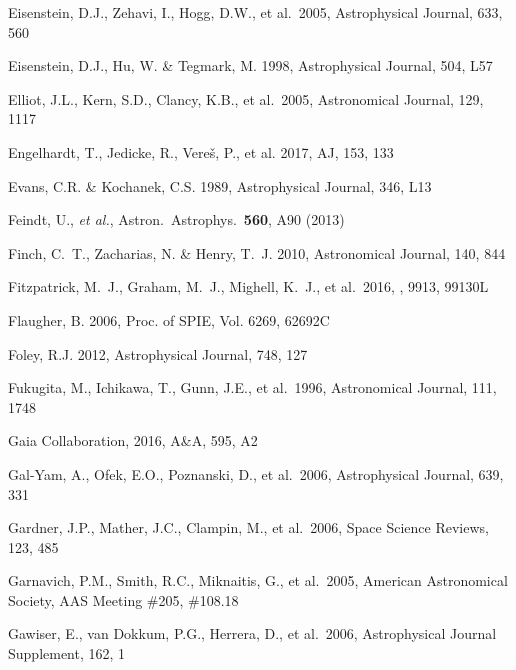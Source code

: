 \documentclass[twocolumn]{aastex61}
\begin{document}
\begin{thebibliography}{}
 Eisenstein, D.J., Zehavi, I., Hogg, D.W., et al.~2005, Astrophysical Journal, 633, 560

 Eisenstein, D.J., Hu, W. \& Tegmark, M. 1998, Astrophysical Journal, 504, L57

 Elliot, J.L., Kern, S.D., Clancy, K.B., et al.~2005,  Astronomical Journal, 129, 1117

 Engelhardt, T., Jedicke, R., Vere\v{s}, P., et al. 2017, AJ, 153, 133

 Evans, C.R. \& Kochanek, C.S. 1989, Astrophysical Journal, 346, L13

 Feindt, U., {\it et al.}, Astron.\ Astrophys.\  {\bf 560}, A90 (2013)

 Finch, C.~T., Zacharias, N. \& Henry, T.~J. 2010, Astronomical Journal, 140, 844

 Fitzpatrick, M.~J., Graham, M.~J., Mighell, K.~J., et al.\ 2016, \procspie, 9913, 99130L

 Flaugher, B. 2006, Proc. of SPIE, Vol. 6269, 62692C

 Foley, R.J. 2012, Astrophysical Journal, 748, 127

 Fukugita, M., Ichikawa, T., Gunn, J.E., et al.~1996, Astronomical Journal, 111, 1748

 Gaia Collaboration, 2016, A\&A, 595, A2

 Gal-Yam, A., Ofek, E.O., Poznanski, D., et al.~2006, Astrophysical Journal, 639, 331

 Gardner, J.P., Mather, J.C., Clampin, M., et al.~2006, Space Science Reviews, 123, 485

 Garnavich, P.M., Smith, R.C., Miknaitis, G., et al.~2005, American Astronomical Society, AAS Meeting \#205, \#108.18

 Gawiser, E., van Dokkum, P.G., Herrera, D., et al.~2006, Astrophysical Journal Supplement, 162, 1


\end{thebibliography}
\end{document}
